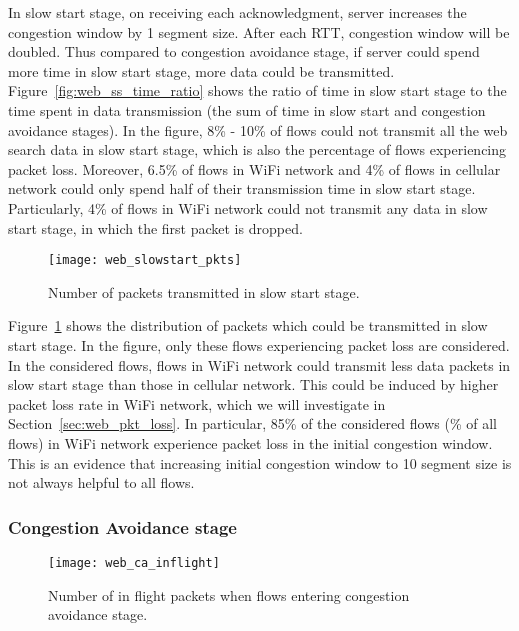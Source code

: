 In slow start stage, on receiving each acknowledgment, server increases the congestion window by 1 segment size. After each RTT, congestion window will be doubled. Thus compared to congestion avoidance stage, if server could spend more time in slow start stage, more data could be transmitted. Figure~\ref{fig:web_ss_time_ratio} shows the ratio of time in slow start stage to the time spent in data transmission (\ie the sum of time in slow start and congestion avoidance stages). In the figure, 8\% - 10\% of flows could not transmit all the web search data in slow start stage, which is also the percentage of flows experiencing packet loss. Moreover, 6.5\% of flows in WiFi network and 4\% of flows in cellular network could only spend half of their transmission time in slow start stage. Particularly, 4\% of flows in WiFi network could not transmit any data in slow start stage, in which the first packet is dropped.

\begin{figure}[th]
\centering
\texttt{[image: web\_slowstart\_pkts]}
\caption{Number of packets transmitted in slow start stage.}
\label{fig:web_ss_pkts}
\end{figure}

Figure~\ref{fig:web_ss_pkts} shows the distribution of packets which could be transmitted in slow start stage. In the figure, only these flows experiencing packet loss are considered. In the considered flows, flows in WiFi network could transmit less data packets in slow start stage than those in cellular network. This could be induced by higher packet loss rate in WiFi network, which we will investigate in Section~\ref{sec:web_pkt_loss}. In particular, 85\% of the considered flows (\% of all flows) in WiFi network experience packet loss in the initial congestion window. This is an evidence that increasing initial congestion window to 10 segment size is not always helpful to all flows.

\subsubsection{Congestion Avoidance stage}

\begin{figure}[th]
\centering
\texttt{[image: web\_ca\_inflight]}
\caption{Number of in flight packets when flows entering congestion avoidance stage.}
\label{fig:web_ca_inflight}
\end{figure}

